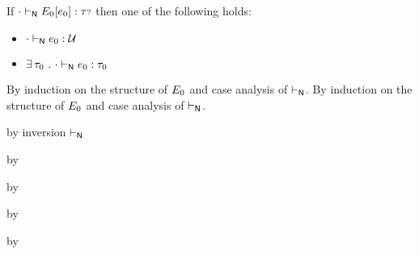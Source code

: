 \begin{lemma}\label{H-typed-hole}\leavevmode
  If\/ ${\cdot} \vdash_{\mathsf{N}} E_0[e_0] : {\tau{\scriptstyle ?}}$
  then one of the following holds:
  \begin{itemize}
    \item ${\cdot} \vdash_{\mathsf{N}} e_0 : {\mathcal U}$
    \item $\exists\,\tau_0~.~{\cdot} \vdash_{\mathsf{N}} e_0 : \tau_0$
  \end{itemize}
\end{lemma}{
\newcommand{\shortproof}{By induction on the structure of $\ctx_0$ and case analysis of $\sWTN$.}
\begin{lamportproof*}
  \shortproof
\mainproof
  \shortproof

    \begin{pfproof}
      \qedstep
    \end{pfproof}

    \begin{pfproof}
        \begin{pfproof}
          by inversion $\vdash_{\mathsf{N}}$
        \end{pfproof}
      \qedstep
        \begin{pfproof}
          by \pfih
        \end{pfproof}
    \end{pfproof}

    \begin{pfproof}
      \qedstep
        \begin{pfproof}
          by \pfih
        \end{pfproof}
    \end{pfproof}

    \begin{pfproof}
      \qedstep
        \begin{pfproof}
          by \pfih
        \end{pfproof}
    \end{pfproof}

    \begin{pfproof}
      \qedstep
        \begin{pfproof}
          by \pfih
        \end{pfproof}
    \end{pfproof}


\end{lamportproof*}}
